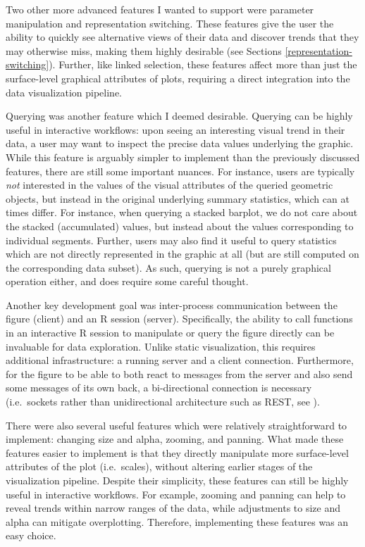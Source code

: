 \documentclass[
  openany]{book}
\theoremstyle{definition}
\theoremstyle{definition}
\theoremstyle{definition}
\theoremstyle{definition}
\theoremstyle{remark}
\begin{document}
Two other more advanced features I wanted to support were parameter manipulation and representation switching. These features give the user the ability to quickly see alternative views of their data and discover trends that they may otherwise miss, making them highly desirable (see Sections \ref{representation-switching}). Further, like linked selection, these features affect more than just the surface-level graphical attributes of plots, requiring a direct integration into the data visualization pipeline.

Querying was another feature which I deemed desirable. Querying can be highly useful in interactive workflows: upon seeing an interesting visual trend in their data, a user may want to inspect the precise data values underlying the graphic. While this feature is arguably simpler to implement than the previously discussed features, there are still some important nuances. For instance, users are typically \emph{not} interested in the values of the visual attributes of the queried geometric objects, but instead in the original underlying summary statistics, which can at times differ. For instance, when querying a stacked barplot, we do not care about the stacked (accumulated) values, but instead about the values corresponding to individual segments. Further, users may also find it useful to query statistics which are not directly represented in the graphic at all (but are still computed on the corresponding data subset). As such, querying is not a purely graphical operation either, and does require some careful thought.

Another key development goal was inter-process communication between the figure (client) and an R session (server). Specifically, the ability to call functions in an interactive R session to manipulate or query the figure directly can be invaluable for data exploration. Unlike static visualization, this requires additional infrastructure: a running server and a client connection. Furthermore, for the figure to be able to both react to messages from the server and also send some messages of its own back, a bi-directional connection is necessary (i.e.~sockets rather than unidirectional architecture such as REST, see ).

There were also several useful features which were relatively straightforward to implement: changing size and alpha, zooming, and panning. What made these features easier to implement is that they directly manipulate more surface-level attributes of the plot (i.e.~scales), without altering earlier stages of the visualization pipeline. Despite their simplicity, these features can still be highly useful in interactive workflows. For example, zooming and panning can help to reveal trends within narrow ranges of the data, while adjustments to size and alpha can mitigate overplotting. Therefore, implementing these features was an easy choice.
\end{document}
